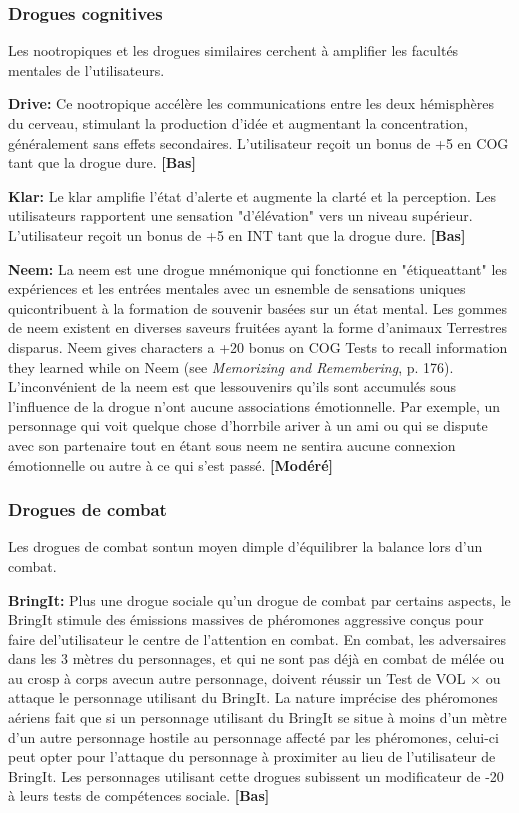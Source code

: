 \subsubsection{Drogues cognitives} 

Les nootropiques et les drogues similaires cerchent à amplifier les facultés mentales de l'utilisateurs. 

\textbf{Drive:} Ce nootropique accélère les communications entre les deux hémisphères du cerveau, stimulant la production d'idée et augmentant la concentration, généralement sans effets secondaires. L'utilisateur reçoit un bonus de +5 en COG tant que la drogue dure. \textbf{[Bas]} 

\textbf{Klar:} Le klar amplifie l'état d'alerte et augmente la clarté et la perception. Les utilisateurs rapportent une sensation "d'élévation" vers un niveau supérieur. L'utilisateur reçoit un bonus de +5 en INT tant que la drogue dure. \textbf{[Bas]} 

\textbf{Neem:} La neem est une drogue mnémonique qui fonctionne en "étiqueattant" les expériences et les entrées mentales avec un esnemble de sensations uniques quicontribuent à la formation de souvenir basées sur un état mental. Les gommes de neem existent en diverses saveurs fruitées ayant la forme d'animaux Terrestres disparus. Neem gives characters a +20 bonus on COG Tests to recall information they learned while on Neem (see \emph{Memorizing and Remembering}, p. 176). L'inconvénient de la neem est que lessouvenirs qu'ils sont accumulés sous l'influence de la drogue n'ont aucune associations émotionnelle. Par exemple, un personnage qui voit quelque chose d'horrbile ariver à un ami ou qui se dispute avec son partenaire tout en étant sous neem ne sentira aucune connexion émotionnelle ou autre à ce qui s'est passé. \textbf{[Modéré]} 

\subsubsection{Drogues de combat} 

Les drogues de combat sontun moyen dimple d'équilibrer la balance lors d'un combat. 

\textbf{BringIt:} Plus une drogue sociale qu'un drogue de combat par certains aspects, le BringIt stimule des émissions massives de phéromones aggressive conçus pour faire del'utilisateur le centre de l'attention en combat. En combat, les adversaires dans les 3 mètres du personnages, et qui ne sont pas déjà en combat de mélée ou au crosp à corps avecun autre personnage, doivent réussir un Test de VOL $\times$ ou attaque le personnage utilisant du BringIt. La nature imprécise des phéromones aériens fait que si un personnage utilisant du BringIt se situe à moins d'un mètre d'un autre personnage hostile au personnage affecté par les phéromones, celui-ci peut opter pour l'attaque du personnage à proximiter au lieu de l'utilisateur de BringIt. Les personnages utilisant cette drogues subissent un modificateur de -20 à leurs tests de compétences sociale. \textbf{[Bas]} 

